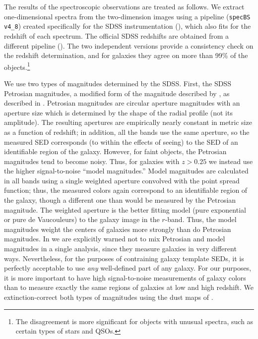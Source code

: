\documentclass[10pt,preprint]{aastex}
\begin{document}
The results of the spectroscopic observations are treated as follows.
We extract one-dimensional spectra from the two-dimension images using
a pipeline ({\tt specBS v4\_8}) created specifically for the SDSS
instrumentation (\citealt{schlegel02a}), which also fits for the
redshift of each spectrum. The official SDSS redshifts are obtained
from a different pipeline (\citealt{subbarao02a}). The two independent
versions provide a consistency check on the redshift determination,
and for galaxies they agree on more than 99\% of the
objects.\footnote{The disagreement is more significant for objects
with unusual spectra, such as certain types of stars and QSOs.}

We use two types of magnitudes determined by the SDSS. First, the SDSS
Petrosian magnitudes, a modified form of the magnitude described by
\citet{petrosian76a}, as described in \citet{strauss02a}.  Petrosian
magnitudes are circular aperture magnitudes with an aperture size
which is determined by the shape of the radial profile (not its
amplitude). The resulting apertures are empirically nearly constant in
metric size as a function of redshift; in addition, all the bands use
the same aperture, so the measured SED corresponds (to within the
effects of seeing) to the SED of an identifiable region of the
galaxy. However, for faint objects, the Petrosian magnitudes tend to
become noisy. Thus, for galaxies with $z>0.25$ we instead use the
higher signal-to-noise ``model magnitudes.'' Model magnitudes are
calculated in all bands using a single weighted aperture convolved
with the point spread function; thus, the measured colors again
correspond to an identifiable region of the galaxy, though a different
one than would be measured by the Petrosian magnitude. The weighted
aperture is the better fitting model (pure exponential or pure de
Vaucouleurs) to the galaxy image in the $r$-band. Thus, the model
magnitudes weight the centers of galaxies more strongly than do
Petrosian magnitudes. In \citet{stoughton02a} we are explicitly warned
not to mix Petrosian and model magnitudes in a single analysis, since
they measure galaxies in very different ways. Nevertheless, for the
purposes of contraining galaxy template SEDs, it is perfectly
acceptable to use {\it any} well-defined part of any galaxy.  For our
purposes, it is more important to have high signal-to-noise
measurements of galaxy colors than to measure exactly the same regions
of galaxies at low and high redshift.  We extinction-correct both
types of magnitudes using the dust maps of \citet{schlegel98a}.
\end{document}
